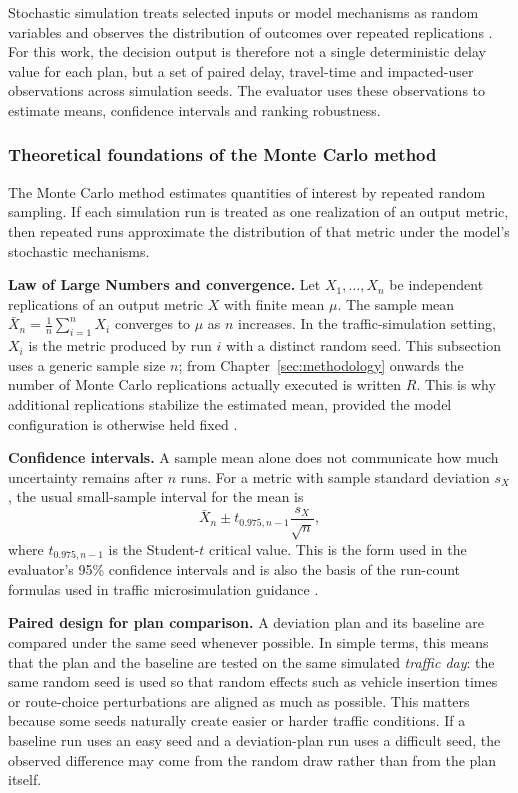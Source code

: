 Stochastic simulation treats selected inputs or model mechanisms as random variables and observes
the distribution of outcomes over repeated replications \cite{law_kelton,number_of_runs_traffic}. For
this work, the decision output is therefore not a single deterministic delay value for each plan,
but a set of paired delay, travel-time and impacted-user observations across simulation seeds.
The evaluator uses these observations to estimate means, confidence intervals and ranking
robustness.

\subsubsection{Theoretical foundations of the Monte Carlo method}

The Monte Carlo method estimates quantities of interest by repeated random sampling. If each
simulation run is treated as one realization of an output metric, then repeated runs approximate
the distribution of that metric under the model's stochastic mechanisms.

\textbf{Law of Large Numbers and convergence.} Let
$X_1,\ldots,X_n$ be independent replications of an output metric $X$ with finite mean $\mu$.
The sample mean $\bar{X}_n = \frac{1}{n}\sum_{i=1}^n X_i$ converges to $\mu$ as $n$ increases. In the
traffic-simulation setting, $X_i$ is the metric produced by run $i$ with a distinct random seed.
This subsection uses a generic sample size $n$; from Chapter~\ref{sec:methodology} onwards the
number of Monte Carlo replications actually executed is written $R$.
This is why additional replications stabilize the estimated mean, provided the model configuration
is otherwise held fixed \cite{law_kelton,number_of_runs_traffic}.

\textbf{Confidence intervals.} A sample mean alone does not communicate how much uncertainty
remains after $n$ runs. For a metric with sample standard deviation $s_X$, the usual small-sample
interval for the mean is
\[
  \bar{X}_n \pm t_{0.975,n-1}\frac{s_X}{\sqrt{n}},
\]
where $t_{0.975,n-1}$ is the Student-$t$ critical value. This is the form used in the evaluator's
95\% confidence intervals and is also the basis of the run-count formulas used in traffic
microsimulation guidance \cite{law_kelton,txdot_number_runs}.

\textbf{Paired design for plan comparison.} A deviation plan and its baseline are compared under
the same seed whenever possible. In simple terms, this means that the plan and the baseline are
tested on the same simulated \textit{traffic day}: the same random seed is used so that random effects
such as vehicle insertion times or route-choice perturbations are aligned as much as possible. This
matters because some seeds naturally create easier or harder traffic conditions. If a baseline run
uses an easy seed and a deviation-plan run uses a difficult seed, the observed difference may come
from the random draw rather than from the plan itself.

